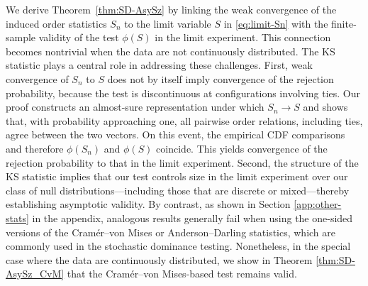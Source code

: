 \documentclass[11pt]{article}
\numberwithin{equation}{section}
\begin{document}
We derive Theorem~\ref{thm:SD-AsySz} by linking the weak convergence of the induced order statistics \( S_n \) to the limit variable \( S \) in \eqref{eq:limit-Sn} with the finite-sample validity of the test \( \phi(S) \) in the limit experiment. This connection becomes nontrivial when the data are not continuously distributed. The KS statistic plays a central role in addressing these challenges. First, weak convergence of $S_n$ to $S$ does not by itself imply convergence of the rejection probability, because the test is discontinuous at configurations involving ties. Our proof constructs an almost-sure representation under which $S_n\to S$ and shows that, with probability approaching one, all pairwise order relations, including ties, agree between the two vectors. On this event, the empirical CDF comparisons and therefore $\phi(S_n)$ and $\phi(S)$ coincide. This yields convergence of the rejection probability to that in the limit experiment. Second, the structure of the KS statistic implies that our test controls size in the limit experiment over our class of null distributions---including those that are discrete or mixed---thereby establishing asymptotic validity. By contrast, as shown in Section \ref{app:other-stats} in the appendix, analogous results generally fail when using the one-sided versions of the Cramér--von Mises or Anderson--Darling statistics, which are commonly used in the stochastic dominance testing. Nonetheless, in the special case where the data are continuously distributed, we show in Theorem \ref{thm:SD-AsySz_CvM} that the Cramér--von Mises-based test remains valid.
\end{document}
